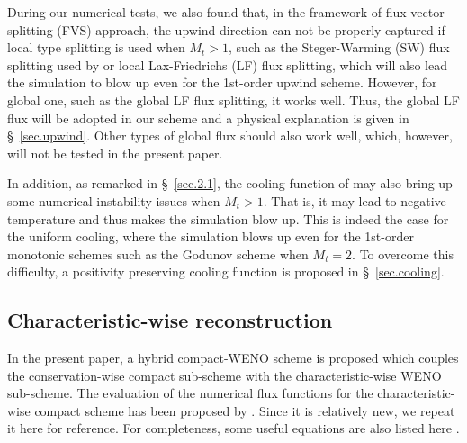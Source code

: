 \documentclass[review]{elsarticle}
\begin{document}
During our numerical tests, we also found that, in the framework of flux vector splitting (FVS) approach, the upwind direction can not be properly captured if local type splitting is used when $M_t > 1$, such as the Steger-Warming (SW) flux splitting used by \citet{Wang2010} or local Lax-Friedrichs (LF) flux splitting, which will also lead the simulation to blow up even for the 1st-order upwind scheme. However, for global one, such as the global LF flux splitting, it works well. Thus, the global LF flux will be adopted in our scheme and a physical explanation is given in \S~\ref{sec.upwind}. Other types of global flux should also work well, which, however, will not be tested in the present paper.

In addition, as remarked in \S~\ref{sec.2.1}, the cooling function of \citet{Wang2010} may also bring up some numerical instability issues when $M_t>1$. That is, it may lead to negative temperature and thus makes the simulation blow up. This is indeed the case for the uniform cooling, where the simulation blows up even for the 1st-order monotonic schemes such as the Godunov scheme when $M_t = 2$. To overcome this difficulty, a positivity preserving cooling function is proposed in \S~\ref{sec.cooling}.


\subsection{Characteristic-wise reconstruction}\label{sec.character}

In the present paper, a hybrid compact-WENO scheme is proposed which couples the conservation-wise compact sub-scheme with the characteristic-wise WENO sub-scheme. The evaluation of the numerical flux functions for the characteristic-wise compact scheme has been proposed by \citet{Ren2003}. Since it is relatively new, we repeat it here for reference. For completeness, some useful equations are also listed here \citep{Toro2009}.
\end{document}
